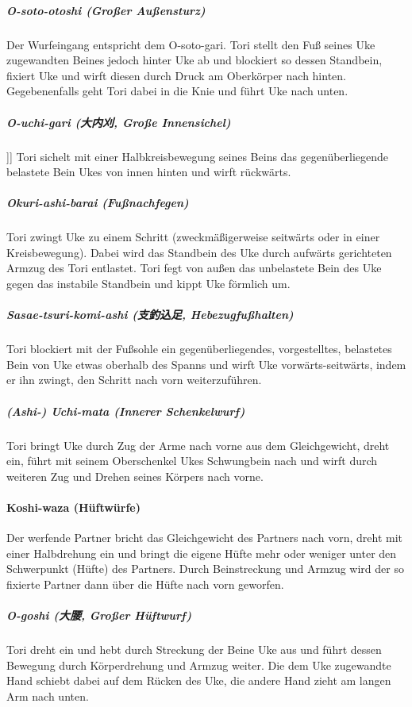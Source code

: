 \documentclass[justified, a4paper, notitlepage, captions=tableheading, nobib]{tufte-handout}
\begin{document}
\subparagraph{O-soto-otoshi (Großer Außensturz)}
\label{sec:orge3ed21e}
Der Wurfeingang entspricht dem O-soto-gari. Tori stellt den Fuß seines Uke zugewandten Beines jedoch hinter Uke ab und blockiert so dessen Standbein, fixiert Uke und wirft diesen durch Druck am Oberkörper nach hinten. Gegebenenfalls geht Tori dabei in die Knie und führt Uke nach unten.

\subparagraph{O-uchi-gari (大内刈, Große Innensichel)}
\label{sec:org89f33d3}
]]
Tori sichelt mit einer Halbkreisbewegung seines Beins das gegenüberliegende belastete Bein Ukes von innen hinten und wirft rückwärts.

\subparagraph{Okuri-ashi-barai (Fußnachfegen)}
\label{sec:orge0b3ad1}
Tori zwingt Uke zu einem Schritt (zweckmäßigerweise seitwärts oder in einer Kreisbewegung). Dabei wird das Standbein des Uke durch aufwärts gerichteten Armzug des Tori entlastet. Tori fegt von außen das unbelastete Bein des Uke gegen das instabile Standbein und kippt Uke förmlich um.

\subparagraph{Sasae-tsuri-komi-ashi (支釣込足, Hebezugfußhalten)}
\label{sec:org969f6b2}
Tori blockiert mit der Fußsohle ein gegenüberliegendes, vorgestelltes, belastetes Bein von Uke etwas oberhalb des Spanns und wirft Uke vorwärts-seitwärts, indem er ihn zwingt, den Schritt nach vorn weiterzuführen.

\subparagraph{(Ashi-) Uchi-mata (Innerer Schenkelwurf)}
\label{sec:org4a87e1d}
Tori bringt Uke durch Zug der Arme nach vorne aus dem Gleichgewicht, dreht ein, führt mit seinem Oberschenkel Ukes Schwungbein nach und wirft durch weiteren Zug und Drehen seines Körpers nach vorne.

\paragraph{Koshi-waza (Hüftwürfe)}
\label{sec:orge28d70d}
Der werfende Partner bricht das Gleichgewicht des Partners nach vorn, dreht mit einer Halbdrehung ein und bringt die eigene Hüfte mehr oder weniger unter den Schwerpunkt (Hüfte) des Partners. Durch Beinstreckung und Armzug wird der so fixierte Partner dann über die Hüfte nach vorn geworfen.

\subparagraph{O-goshi (大腰, Großer Hüftwurf)}
\label{sec:org7aa161b}
Tori dreht ein und hebt durch Streckung der Beine Uke aus und führt dessen Bewegung durch Körperdrehung und Armzug weiter. Die dem Uke zugewandte Hand schiebt dabei auf dem Rücken des Uke, die andere Hand zieht am langen Arm nach unten.
\end{document}
